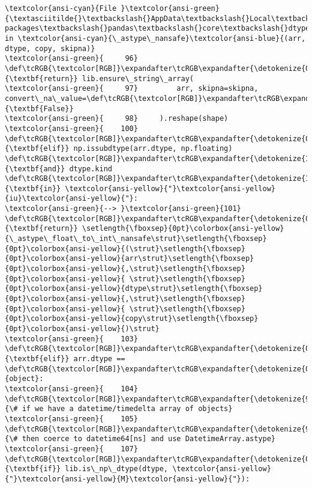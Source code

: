 \documentclass[11pt]{article}
\begin{document}
\begin{Verbatim}[commandchars=\\\{\}, frame=single, framerule=2mm, rulecolor=\color{outerrorbackground}]
\textcolor{ansi-cyan}{File }\textcolor{ansi-green}{\textasciitilde{}\textbackslash{}AppData\textbackslash{}Local\textbackslash{}Programs\textbackslash{}Python\textbackslash{}Python313\textbackslash{}Lib\textbackslash{}site-packages\textbackslash{}pandas\textbackslash{}core\textbackslash{}dtypes\textbackslash{}astype.py:101}, in \textcolor{ansi-cyan}{\_astype\_nansafe}\textcolor{ansi-blue}{(arr, dtype, copy, skipna)}
\textcolor{ansi-green}{     96}     \def\tcRGB{\textcolor[RGB]}\expandafter\tcRGB\expandafter{\detokenize{0,135,0}}{\textbf{return}} lib.ensure\_string\_array(
\textcolor{ansi-green}{     97}         arr, skipna=skipna, convert\_na\_value=\def\tcRGB{\textcolor[RGB]}\expandafter\tcRGB\expandafter{\detokenize{0,135,0}}{\textbf{False}}
\textcolor{ansi-green}{     98}     ).reshape(shape)
\textcolor{ansi-green}{    100} \def\tcRGB{\textcolor[RGB]}\expandafter\tcRGB\expandafter{\detokenize{0,135,0}}{\textbf{elif}} np.issubdtype(arr.dtype, np.floating) \def\tcRGB{\textcolor[RGB]}\expandafter\tcRGB\expandafter{\detokenize{175,0,255}}{\textbf{and}} dtype.kind \def\tcRGB{\textcolor[RGB]}\expandafter\tcRGB\expandafter{\detokenize{175,0,255}}{\textbf{in}} \textcolor{ansi-yellow}{"}\textcolor{ansi-yellow}{iu}\textcolor{ansi-yellow}{"}:
\textcolor{ansi-green}{--> }\textcolor{ansi-green}{101}     \def\tcRGB{\textcolor[RGB]}\expandafter\tcRGB\expandafter{\detokenize{0,135,0}}{\textbf{return}} \setlength{\fboxsep}{0pt}\colorbox{ansi-yellow}{\_astype\_float\_to\_int\_nansafe\strut}\setlength{\fboxsep}{0pt}\colorbox{ansi-yellow}{(\strut}\setlength{\fboxsep}{0pt}\colorbox{ansi-yellow}{arr\strut}\setlength{\fboxsep}{0pt}\colorbox{ansi-yellow}{,\strut}\setlength{\fboxsep}{0pt}\colorbox{ansi-yellow}{ \strut}\setlength{\fboxsep}{0pt}\colorbox{ansi-yellow}{dtype\strut}\setlength{\fboxsep}{0pt}\colorbox{ansi-yellow}{,\strut}\setlength{\fboxsep}{0pt}\colorbox{ansi-yellow}{ \strut}\setlength{\fboxsep}{0pt}\colorbox{ansi-yellow}{copy\strut}\setlength{\fboxsep}{0pt}\colorbox{ansi-yellow}{)\strut}
\textcolor{ansi-green}{    103} \def\tcRGB{\textcolor[RGB]}\expandafter\tcRGB\expandafter{\detokenize{0,135,0}}{\textbf{elif}} arr.dtype == \def\tcRGB{\textcolor[RGB]}\expandafter\tcRGB\expandafter{\detokenize{0,135,0}}{object}:
\textcolor{ansi-green}{    104}     \def\tcRGB{\textcolor[RGB]}\expandafter\tcRGB\expandafter{\detokenize{95,135,135}}{\# if we have a datetime/timedelta array of objects}
\textcolor{ansi-green}{    105}     \def\tcRGB{\textcolor[RGB]}\expandafter\tcRGB\expandafter{\detokenize{95,135,135}}{\# then coerce to datetime64[ns] and use DatetimeArray.astype}
\textcolor{ansi-green}{    107}     \def\tcRGB{\textcolor[RGB]}\expandafter\tcRGB\expandafter{\detokenize{0,135,0}}{\textbf{if}} lib.is\_np\_dtype(dtype, \textcolor{ansi-yellow}{"}\textcolor{ansi-yellow}{M}\textcolor{ansi-yellow}{"}):


\end{Verbatim}
\end{document}
